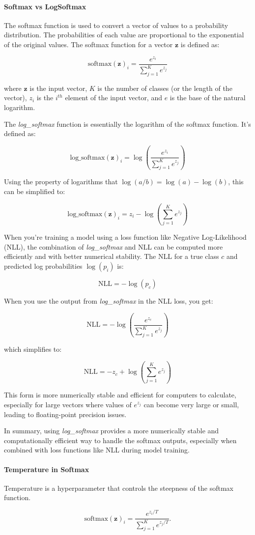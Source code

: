 \paragraph{Softmax vs LogSoftmax}

The softmax function is used to convert a vector of values to a probability distribution.
The probabilities of each value are proportional to the exponential of the original values. The softmax function for a vector \( \mathbf{z} \) is defined as:

\[ \mathrm{softmax}(\mathbf{z})_i = \frac{e^{z_i}}{\sum_{j=1}^{K} e^{z_j}} \]

where \( \mathbf{z} \) is the input vector, \( K \) is the number of classes (or the length of the vector), \( z_i \) is the \( i^{th} \) element of the input vector, and \( e \) is the base of the natural logarithm.

The \emph{log\_softmax} function is essentially the logarithm of the softmax function.
It's defined as:

\[ \mathrm{log\_softmax}(\mathbf{z})_i = \log\left(\frac{e^{z_i}}{\sum_{j=1}^{K} e^{z_j}}\right) \]

Using the property of logarithms that \( \log(a/b) = \log(a) - \log(b) \), this can be simplified to:

\[ \mathrm{log\_softmax}(\mathbf{z})_i = z_i - \log\left(\sum_{j=1}^{K} e^{z_j}\right) \]

When you're training a model using a loss function like Negative Log-Likelihood (NLL), the combination of \emph{log\_softmax} and NLL can be computed more efficiently and with better numerical stability.
The NLL for a true class \( c \) and predicted log probabilities \( \log(p_i) \) is:

\[ \mathrm{NLL} = -\log(p_c) \]

When you use the output from \emph{log\_softmax} in the NLL loss, you get:

\[ \mathrm{NLL} = -\log\left(\frac{e^{z_c}}{\sum_{j=1}^{K} e^{z_j}}\right) \]

which simplifies to:

\[ \mathrm{NLL} = -z_c + \log\left(\sum_{j=1}^{K} e^{z_j}\right) \]

This form is more numerically stable and efficient for computers to calculate, especially for large vectors where values of \( e^{z_j} \) can become very large or small, leading to floating-point precision issues.

In summary, using \emph{log\_softmax} provides a more numerically stable and computationally efficient way to handle the softmax outputs, especially when combined with loss functions like NLL during model training.

\paragraph{Temperature in Softmax}

Temperature is a hyperparameter that controls the steepness of the softmax function.

\[
    \mathrm{softmax}(\mathbf{z})_i = \frac{e^{z_i/T}}{\sum_{j=1}^{K} e^{z_j/T}}
.\]

